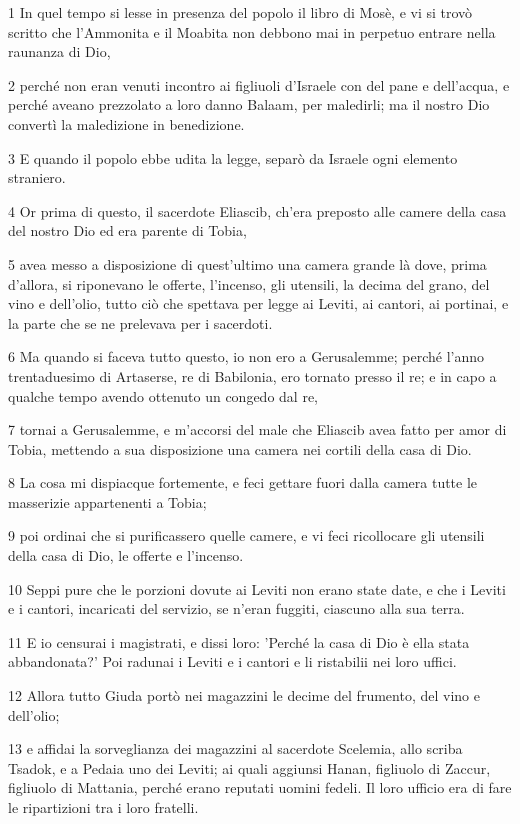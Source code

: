 \par 1 In quel tempo si lesse in presenza del popolo il libro di Mosè, e vi si trovò scritto che l'Ammonita e il Moabita non debbono mai in perpetuo entrare nella raunanza di Dio,
\par 2 perché non eran venuti incontro ai figliuoli d'Israele con del pane e dell'acqua, e perché aveano prezzolato a loro danno Balaam, per maledirli; ma il nostro Dio convertì la maledizione in benedizione.
\par 3 E quando il popolo ebbe udita la legge, separò da Israele ogni elemento straniero.
\par 4 Or prima di questo, il sacerdote Eliascib, ch'era preposto alle camere della casa del nostro Dio ed era parente di Tobia,
\par 5 avea messo a disposizione di quest'ultimo una camera grande là dove, prima d'allora, si riponevano le offerte, l'incenso, gli utensili, la decima del grano, del vino e dell'olio, tutto ciò che spettava per legge ai Leviti, ai cantori, ai portinai, e la parte che se ne prelevava per i sacerdoti.
\par 6 Ma quando si faceva tutto questo, io non ero a Gerusalemme; perché l'anno trentaduesimo di Artaserse, re di Babilonia, ero tornato presso il re; e in capo a qualche tempo avendo ottenuto un congedo dal re,
\par 7 tornai a Gerusalemme, e m'accorsi del male che Eliascib avea fatto per amor di Tobia, mettendo a sua disposizione una camera nei cortili della casa di Dio.
\par 8 La cosa mi dispiacque fortemente, e feci gettare fuori dalla camera tutte le masserizie appartenenti a Tobia;
\par 9 poi ordinai che si purificassero quelle camere, e vi feci ricollocare gli utensili della casa di Dio, le offerte e l'incenso.
\par 10 Seppi pure che le porzioni dovute ai Leviti non erano state date, e che i Leviti e i cantori, incaricati del servizio, se n'eran fuggiti, ciascuno alla sua terra.
\par 11 E io censurai i magistrati, e dissi loro: 'Perché la casa di Dio è ella stata abbandonata?' Poi radunai i Leviti e i cantori e li ristabilii nei loro uffici.
\par 12 Allora tutto Giuda portò nei magazzini le decime del frumento, del vino e dell'olio;
\par 13 e affidai la sorveglianza dei magazzini al sacerdote Scelemia, allo scriba Tsadok, e a Pedaia uno dei Leviti; ai quali aggiunsi Hanan, figliuolo di Zaccur, figliuolo di Mattania, perché erano reputati uomini fedeli. Il loro ufficio era di fare le ripartizioni tra i loro fratelli.
